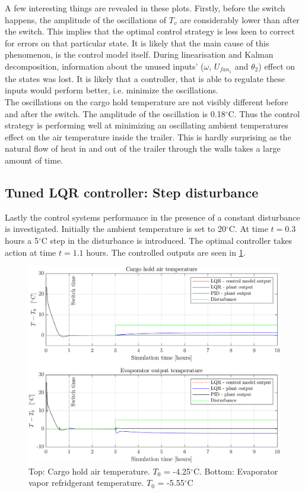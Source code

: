 A few interesting things are revealed in these plots. Firstly, before the switch happens, the amplitude of the oscillations of $T_v$ are considerably lower than after the switch. This implies that the optimal control strategy is less keen to correct for errors on that particular state. It is likely that the main cause of this phenomenon, is the control model itself. During linearisation and Kalman decomposition, information about the unused inputs' ($\omega$, $U_{fan_1}$ and $\theta_2$) effect on the states was lost. It is likely that a controller, that is able to regulate these inputs would perform better, i.e. minimize the oscillations.\\

The oscillations on the cargo hold temperature are not visibly different before and after the switch. The amplitude of the oscillation is 0.18$^{\circ}$C. Thus the control strategy is performing well at minimizing an oscillating ambient temperatures effect on the air temperature inside the trailer. This is hardly surprising as the natural flow of heat in and out of the trailer through the walls takes a large amount of time. \\


\newpage
\subsection{Tuned LQR controller: Step disturbance}
Lastly the control systems performance in the presence of a constant disturbance is investigated. Initially the ambient temperature is set to 20$^{\circ}$C. At time $t=0.3$ hours a 5$^{\circ}$C step in the disturbance is introduced. The optimal controller takes action at time $t=1.1$ hours. The controlled outputs are seen in \cref{fig:LQR_wellTuned_5stepDist}.\\

\begin{figure}[h!]
	\centering
	\includegraphics[width=1\textwidth]{Graphics/fig_LQRvsKresten_stepDist.png}
	\caption{Top: Cargo hold air temperature. $T_0$ = -4.25$^{\circ}$C. Bottom: Evaporator vapor refridgerant temperature. $T_0$ = -5.55$^{\circ}$C}
	\label{fig:LQR_wellTuned_5stepDist}
\end{figure}

